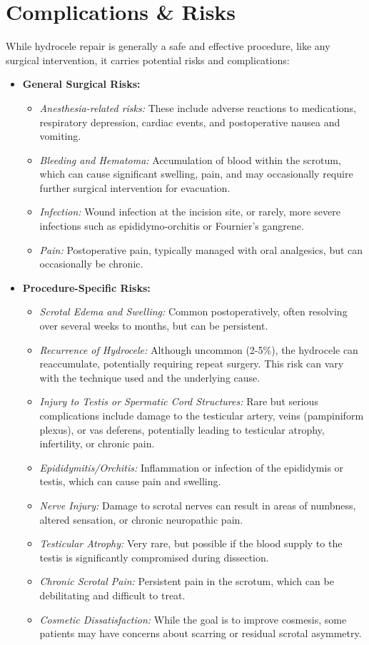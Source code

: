 \section*{Complications \& Risks}
While hydrocele repair is generally a safe and effective procedure, like any surgical intervention, it carries potential risks and complications:

\begin{itemize}
  \item \textbf{General Surgical Risks:}
    \begin{itemize}
      \item \textit{Anesthesia-related risks:} These include adverse reactions to medications, respiratory depression, cardiac events, and postoperative nausea and vomiting.
      \item \textit{Bleeding and Hematoma:} Accumulation of blood within the scrotum, which can cause significant swelling, pain, and may occasionally require further surgical intervention for evacuation.
      \item \textit{Infection:} Wound infection at the incision site, or rarely, more severe infections such as epididymo-orchitis or Fournier's gangrene.
      \item \textit{Pain:} Postoperative pain, typically managed with oral analgesics, but can occasionally be chronic.
    \end{itemize}
  \item \textbf{Procedure-Specific Risks:}
    \begin{itemize}
      \item \textit{Scrotal Edema and Swelling:} Common postoperatively, often resolving over several weeks to months, but can be persistent.
      \item \textit{Recurrence of Hydrocele:} Although uncommon (2-5\%), the hydrocele can reaccumulate, potentially requiring repeat surgery. This risk can vary with the technique used and the underlying cause.
      \item \textit{Injury to Testis or Spermatic Cord Structures:} Rare but serious complications include damage to the testicular artery, veins (pampiniform plexus), or vas deferens, potentially leading to testicular atrophy, infertility, or chronic pain.
      \item \textit{Epididymitis/Orchitis:} Inflammation or infection of the epididymis or testis, which can cause pain and swelling.
      \item \textit{Nerve Injury:} Damage to scrotal nerves can result in areas of numbness, altered sensation, or chronic neuropathic pain.
      \item \textit{Testicular Atrophy:} Very rare, but possible if the blood supply to the testis is significantly compromised during dissection.
      \item \textit{Chronic Scrotal Pain:} Persistent pain in the scrotum, which can be debilitating and difficult to treat.
      \item \textit{Cosmetic Dissatisfaction:} While the goal is to improve cosmesis, some patients may have concerns about scarring or residual scrotal asymmetry.
    \end{itemize}
\end{itemize}

